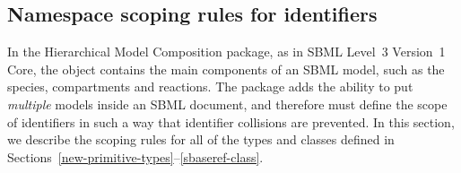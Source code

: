 \clearpage

\subsection{Namespace scoping rules for identifiers}
\label{namespaces}

In the Hierarchical Model Composition package, as in SBML Level~3
Version~1 Core, the \Model object contains the main components of an
SBML model, such as the species, compartments and reactions.  The
package adds the ability to put \emph{multiple} models inside an SBML
document, and therefore must define the scope of identifiers in such a
way that identifier collisions are prevented.  In this section, we
describe the scoping rules for all of the types and classes defined in
Sections~\ref{new-primitive-types}--\ref{sbaseref-class}.

